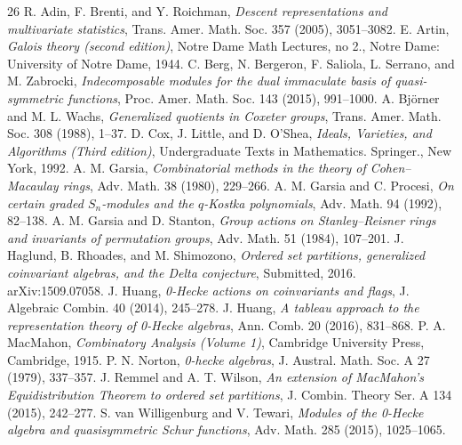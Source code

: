 \begin{thebibliography}{26}
 R. Adin, F. Brenti, and Y. Roichman, \emph{Descent representations and multivariate statistics}, Trans. Amer. Math. Soc. 357 (2005), 3051--3082.
 E. Artin, \emph{Galois theory (second edition)}, Notre Dame Math Lectures, no 2., Notre Dame: University of Notre Dame, 1944.
 C. Berg, N. Bergeron, F. Saliola, L. Serrano, and M. Zabrocki, \emph{Indecomposable modules for the dual immaculate basis of quasi-symmetric functions}, Proc. Amer. Math. Soc. 143 (2015), 991--1000.
 A. Bj\"orner and M. L. Wachs, \emph{Generalized quotients in Coxeter groups}, Trans. Amer. Math. Soc. 308 (1988), 1--37.
 D. Cox, J. Little, and D. O'Shea, \emph{Ideals, Varieties, and Algorithms (Third edition)}, Undergraduate Texts in Mathematics. Springer., New York, 1992.
 A. M. Garsia, \emph{Combinatorial methods in the theory of Cohen--Macaulay rings}, Adv. Math. 38 (1980), 229--266.
 A. M. Garsia and C. Procesi, \emph{On certain graded $S_n$-modules and the $q$-Kostka polynomials}, Adv. Math. 94 (1992), 82--138.
 A. M. Garsia and D. Stanton, \emph{Group actions on Stanley--Reisner rings and invariants of permutation groups}, Adv. Math. 51 (1984), 107--201.
 J. Haglund, B. Rhoades, and M. Shimozono, \emph{Ordered set partitions, generalized coinvariant algebras, and the Delta conjecture}, Submitted, 2016. arXiv:1509.07058.
 J. Huang, \emph{0-Hecke actions on coinvariants and flags}, J. Algebraic Combin. 40 (2014), 245--278.
 J. Huang, \emph{A tableau approach to the representation theory of 0-Hecke algebras}, Ann. Comb. 20 (2016), 831--868.
 P. A. MacMahon, \emph{Combinatory Analysis (Volume 1)}, Cambridge University Press, Cambridge, 1915.
 P. N. Norton, \emph{0-hecke algebras}, J. Austral. Math. Soc. A 27 (1979), 337--357.
 J. Remmel and A. T. Wilson, \emph{An extension of MacMahon's Equidistribution Theorem to ordered set partitions}, J. Combin. Theory Ser. A 134 (2015), 242--277.
 S. van Willigenburg and V. Tewari, \emph{Modules of the 0-Hecke algebra and quasisymmetric Schur functions}, Adv. Math. 285 (2015), 1025--1065.
\end{thebibliography}

